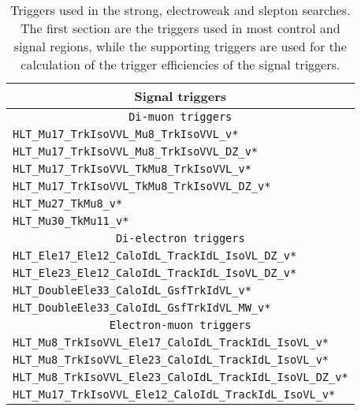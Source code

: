 \begin{table}[ht!]
\def\arraystretch{1.2}
    \caption{Triggers used in the strong, electroweak and slepton searches. The first section are the triggers used in most control and signal regions, while the supporting triggers are used for the calculation of the trigger efficiencies of the signal triggers.}
    \label{tab:triggers}
    \begin{center}
        \begin{tabular}{ l}
        \hline \hline
        \multicolumn{1}{c}{\textbf{Signal triggers} }             \\
        \hline 
        \multicolumn{1}{c}{\texttt{Di-muon triggers} }             \\
        \hline 
        \texttt{HLT\_Mu17\_TrkIsoVVL\_Mu8\_TrkIsoVVL\_v*}         \\
        \texttt{HLT\_Mu17\_TrkIsoVVL\_Mu8\_TrkIsoVVL\_DZ\_v*}      \\
        \texttt{HLT\_Mu17\_TrkIsoVVL\_TkMu8\_TrkIsoVVL\_v*}       \\
        \texttt{HLT\_Mu17\_TrkIsoVVL\_TkMu8\_TrkIsoVVL\_DZ\_v*}     \\
        \texttt{HLT\_Mu27\_TkMu8\_v*}                                \\ 
        \texttt{HLT\_Mu30\_TkMu11\_v*}                               \\
        \hline 
        \multicolumn{1}{c}{\texttt{Di-electron triggers} }             \\
        \hline 
        \texttt{HLT\_Ele17\_Ele12\_CaloIdL\_TrackIdL\_IsoVL\_DZ\_v*}   \\ 
        \texttt{HLT\_Ele23\_Ele12\_CaloIdL\_TrackIdL\_IsoVL\_DZ\_v*}    \\
        \texttt{HLT\_DoubleEle33\_CaloIdL\_GsfTrkIdVL\_v*}               \\
        \texttt{HLT\_DoubleEle33\_CaloIdL\_GsfTrkIdVL\_MW\_v*}               \\
        \hline 
        \multicolumn{1}{c}{\texttt{Electron-muon triggers} }             \\
        \hline 
        \texttt{HLT\_Mu8\_TrkIsoVVL\_Ele17\_CaloIdL\_TrackIdL\_IsoVL\_v*} \\
        \texttt{HLT\_Mu8\_TrkIsoVVL\_Ele23\_CaloIdL\_TrackIdL\_IsoVL\_v*}    \\
        \texttt{HLT\_Mu8\_TrkIsoVVL\_Ele23\_CaloIdL\_TrackIdL\_IsoVL\_DZ\_v*}    \\
        \texttt{HLT\_Mu17\_TrkIsoVVL\_Ele12\_CaloIdL\_TrackIdL\_IsoVL\_v*}    \\

\end{tabular}
\end{center}
\end{table}
